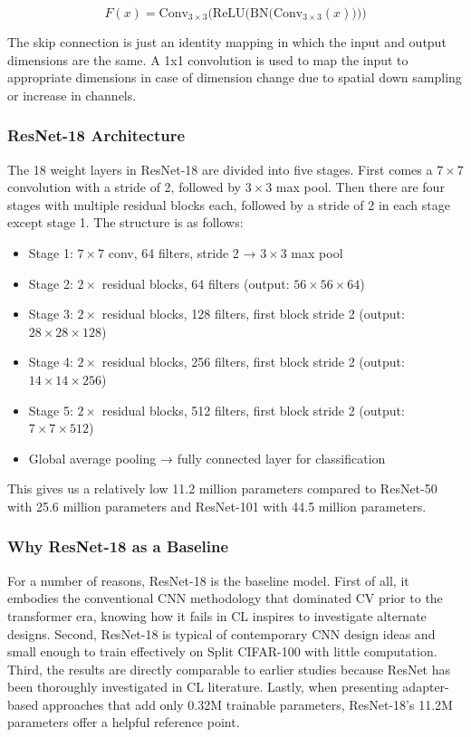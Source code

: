 \documentclass[english, LaM, oneside]{sapthesis}%
\numberwithin{equation}{chapter}
\begin{document}
\begin{equation}
    F(x) = \mathrm{Conv}_{3\times3} \Big( \mathrm{ReLU} \big( \mathrm{BN} \big( \mathrm{Conv}_{3\times3}(x) \big) \big) \Big)
\end{equation}

The skip connection is just an identity mapping in which the input and output dimensions are the same. A 1x1 convolution is used to map the input to appropriate dimensions in case of dimension change due to spatial down sampling or increase in channels.

\subsubsection{ResNet-18 Architecture}
The 18 weight layers in ResNet-18 are divided into five stages. First comes a $7\times7$  convolution with a stride of 2, followed by $3\times3$ max pool. Then there are four stages with multiple residual blocks each, followed by a stride of 2 in each stage except stage 1\cite{3}. The structure is as follows:

\begin{itemize}
    \item Stage 1: $7\times7$ conv, 64 filters, stride 2 → $3\times3$ max pool
    \item Stage 2: $2\times$ residual blocks, 64 filters (output: $56\times56\times64$)
    \item Stage 3: $2\times$ residual blocks, 128 filters, first block stride 2 (output: $28\times28\times128$)
    \item Stage 4: $2\times$ residual blocks, 256 filters, first block stride 2 (output: $14\times14\times256$)
    \item Stage 5: $2\times$ residual blocks, 512 filters, first block stride 2 (output: $7\times7\times512$)
    \item Global average pooling → fully connected layer for classification
\end{itemize}
This gives us a relatively low 11.2 million parameters compared to ResNet-50 with 25.6 million parameters and ResNet-101 with 44.5 million parameters.

\subsubsection{Why ResNet-18 as a Baseline}
For a number of reasons, ResNet-18 is the baseline model. First of all, it embodies the conventional CNN methodology that dominated CV prior to the transformer era, knowing how it fails in CL inspires to investigate alternate designs. Second, ResNet-18 is typical of contemporary CNN design ideas and small enough to train effectively on Split CIFAR-100 with little computation. Third, the results are directly comparable to earlier studies because ResNet has been thoroughly investigated in CL literature. Lastly, when presenting adapter-based approaches that add only 0.32M trainable parameters, ResNet-18's 11.2M parameters offer a helpful reference point.
\end{document}
